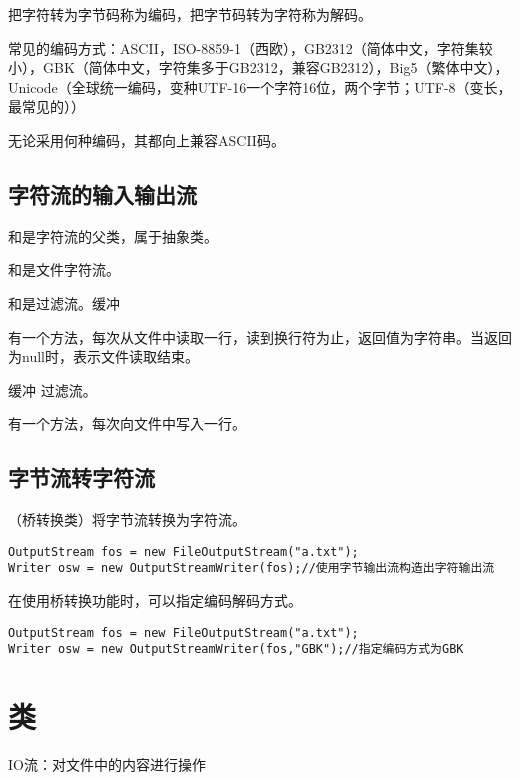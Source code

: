 \documentclass[a4paper]{report}
\begin{document}
把字符转为字节码称为编码，把字节码转为字符称为解码。

常见的编码方式：ASCII，ISO-8859-1（西欧），GB2312（简体中文，字符集较小），GBK（简体中文，字符集多于GB2312，兼容GB2312），Big5（繁体中文），Unicode（全球统一编码，变种UTF-16一个字符16位，两个字节；UTF-8（变长，最常见的））

无论采用何种编码，其都向上兼容ASCII码。

\subsection{字符流的输入输出流}
和是字符流的父类，属于抽象类。

和是文件字符流。

和是过滤流。缓冲

\begin{tips}
有一个方法，每次从文件中读取一行，读到换行符为止，返回值为字符串。当返回为null时，表示文件读取结束。
\end{tips}

缓冲  过滤流。

\begin{tips}
有一个方法，每次向文件中写入一行。
\end{tips}

\subsection{字节流转字符流}
（桥转换类）将字节流转换为字符流。
\begin{lstlisting}
OutputStream fos = new FileOutputStream("a.txt");
Writer osw = new OutputStreamWriter(fos);//使用字节输出流构造出字符输出流
\end{lstlisting}

\begin{tips}
在使用桥转换功能时，可以指定编码解码方式。
\begin{lstlisting}
OutputStream fos = new FileOutputStream("a.txt");
Writer osw = new OutputStreamWriter(fos,"GBK");//指定编码方式为GBK
\end{lstlisting}
\hphantom{~}
\end{tips}

\section{类}
IO流：对文件中的内容进行操作
\end{document}

